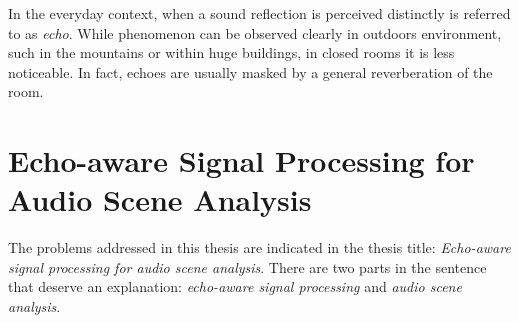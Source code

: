 

 \lipsum[1]
In the everyday context, when a sound reflection is perceived distinctly is referred to as \textit{echo}.
While phenomenon can be observed clearly in outdoors environment, such in the mountains or within huge buildings, in closed rooms it is less noticeable.
In fact, echoes are usually masked by a general reverberation of the room.

\section{Echo-aware Signal Processing for Audio Scene Analysis}\label{sec:intro:problem}
The problems addressed in this thesis are indicated in the thesis title: \textit{Echo-aware signal processing for audio scene analysis}.
There are two parts in the sentence that deserve an explanation: \textit{echo-aware signal processing} and \textit{audio scene analysis}.

